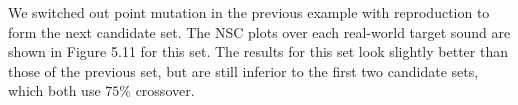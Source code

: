 \documentclass[12pt]{report} 	%
\numberwithin{figure}{chapter}
\numberwithin{table}{chapter}
\numberwithin{equation}{chapter}
\begin{document}
\begin{flushleft}
We switched out point mutation in the previous example with reproduction to form the next candidate set. The NSC plots over each real-world target sound are shown in Figure 5.11 for this set.
The results for this set look slightly better than those of the previous set, but are still inferior to the first two candidate sets, which both use $75\%$ crossover.


\end{flushleft}
\end{document}
